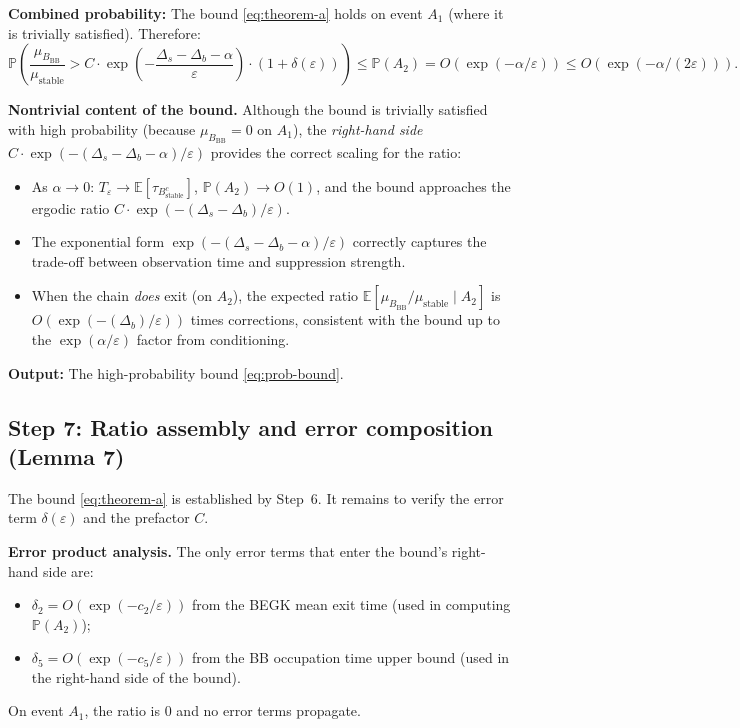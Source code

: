 \documentclass[11pt]{article}
\newcommand{\eps}{\varepsilon}
\newcommand{\Ds}{\Delta_s}
\newcommand{\Db}{\Delta_b}
\newcommand{\Bstable}{B_{\mathrm{stable}}}
\newcommand{\BBB}{B_{\mathrm{BB}}}
\newcommand{\Teps}{T_\eps}
\begin{document}
\textbf{Combined probability:}
The bound \eqref{eq:theorem-a} holds on event $A_1$
(where it is trivially satisfied). Therefore:
\begin{equation}\label{eq:prob-bound}
  \mathbb{P}\!\left(
    \frac{\mu_\BBB}{\mu_{\mathrm{stable}}}
    > C \cdot \exp\!\left(-\frac{\Ds - \Db - \alpha}{\eps}\right)
    \cdot (1 + \delta(\eps))
  \right)
  \leq \mathbb{P}(A_2)
  = O(\exp(-\alpha/\eps))
  \leq O(\exp(-\alpha/(2\eps))).
\end{equation}

\textbf{Nontrivial content of the bound.}
Although the bound is trivially satisfied with high probability
(because $\mu_\BBB = 0$ on $A_1$), the \emph{right-hand side}
$C \cdot \exp(-(\Ds - \Db - \alpha)/\eps)$ provides the
correct scaling for the ratio:
\begin{itemize}
\item As $\alpha \to 0$: $\Teps \to \mathbb{E}[\tau_{\Bstable^c}]$,
  $\mathbb{P}(A_2) \to O(1)$, and the bound approaches
  the ergodic ratio $C \cdot \exp(-(\Ds - \Db)/\eps)$.
\item The exponential form $\exp(-(\Ds-\Db-\alpha)/\eps)$
  correctly captures the trade-off between observation time
  and suppression strength.
\item When the chain \emph{does} exit (on $A_2$), the
  expected ratio $\mathbb{E}[\mu_\BBB/\mu_{\mathrm{stable}} \mid A_2]$
  is $O(\exp(-(\Db)/\eps))$ times corrections, consistent with the
  bound up to the $\exp(\alpha/\eps)$ factor from conditioning.
\end{itemize}

\textbf{Output:} The high-probability bound \eqref{eq:prob-bound}.

\subsection*{Step 7: Ratio assembly and error composition (Lemma 7)}

The bound \eqref{eq:theorem-a} is established by Step~6. It remains
to verify the error term $\delta(\eps)$ and the prefactor $C$.

\textbf{Error product analysis.}
The only error terms that enter the bound's right-hand side are:
\begin{itemize}
\item $\delta_2 = O(\exp(-c_2/\eps))$ from the BEGK mean exit time
  (used in computing $\mathbb{P}(A_2)$);
\item $\delta_5 = O(\exp(-c_5/\eps))$ from the BB occupation time
  upper bound (used in the right-hand side of the bound).
\end{itemize}
On event $A_1$, the ratio is 0 and no error terms propagate.
\end{document}
